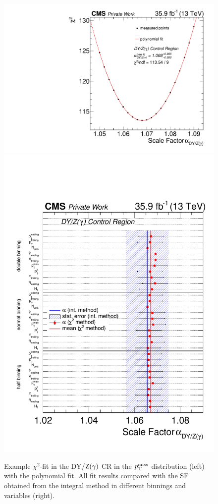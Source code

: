 \begin{figure}[tbp]
 \centering
 \includegraphics[width=\pairwidth]{figures/plots_CR/chi/DY_LL_met}
 \includegraphics[width=\pairwidth]{figures/plots_CR/chi/DY_CompareLL}
 \caption{Example $\chi^2$-fit in the DY/$\mathrm{Z}(\gamma)$ CR in the $p_{\mathrm{T}}^\text{miss}$ distribution (left) with the polynomial fit. All fit results compared with the SF obtained from the integral method in different binnings and variables (right).}
 \label{fig:chiDY}
\end{figure}



